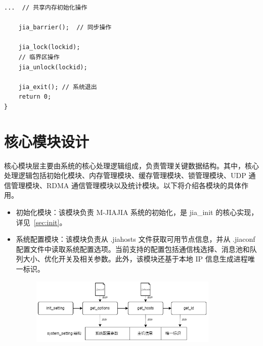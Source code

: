 {\begin{lstlisting}[style=CStyle, caption={M-JIAJIA 应用模板}, label={lst:jia-template}]
    ...  // 共享内存初始化操作

    jia_barrier();  // 同步操作    

    jia_lock(lockid);
    // 临界区操作
    jia_unlock(lockid);
    
    jia_exit(); // 系统退出
    return 0;
}
\end{lstlisting}
    \section{核心模块设计}
    核心模块层主要由系统的核心处理逻辑组成，负责管理关键数据结构。其中，核心处理逻辑包括初始化模块、内存管理模块、缓存管理模块、锁管理模块、UDP 通信管理模块、RDMA 通信管理模块以及统计模块。以下将介绍各模块的具体作用。
    \begin{itemize}
        \item 初始化模块：该模块负责 M-JIAJIA 系统的初始化，是 jia\_init 的核心实现，详见~\ref{sec:init}。
        \item 系统配置模块：该模块负责从 .jiahosts 文件获取可用节点信息，并从 .jiaconf 配置文件中读取系统配置选项。当前支持的配置包括通信栈选择、消息池和队列大小、优化开关及相关参数。此外，该模块还基于本地 IP 信息生成进程唯一标识。
              \begin{figure}[!htbp]
                  \centering
                  \includegraphics[width=0.85\textwidth]{Img/system_setting.png}
                  \label{fig:system-setting-module}
              \end{figure}


\end{itemize}}
